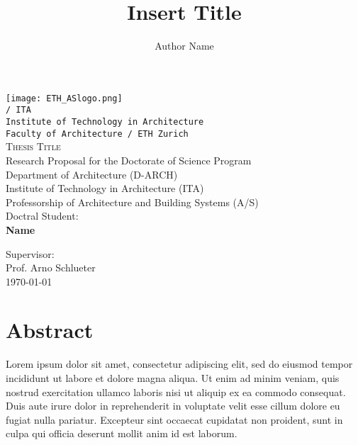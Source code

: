 
\begin{titlepage}
\vspace*{-2.5cm}
\hspace*{-1cm}

\noindent
\texttt{[image: ETH\_ASlogo.png]}\\


\noindent
\texttt{\textcolor{suatblue}{/ ITA\\
	Institute of Technology in Architecture\\
	Faculty of Architecture / ETH Zurich}}\\[.5cm]


\noindent
\textsc{\LARGE Thesis Title }\\[0.4cm]

\noindent
Research Proposal for the Doctorate of Science Program\\
Department of Architecture (D-ARCH)\\
Institute of Technology in Architecture (ITA)\\
Professorship of Architecture and Building Systems (A/S)\\[0.5cm]

\noindent
Doctral Student:\\
\textbf{Name}

\noindent
Supervisor:\\
Prof. Arno Schlueter\\[0.5cm]
\noindent
\today\\[0.1cm]

\section*{Abstract}

Lorem ipsum dolor sit amet, consectetur adipiscing elit, sed do eiusmod tempor incididunt ut labore et dolore magna aliqua. Ut enim ad minim veniam, quis nostrud exercitation ullamco laboris nisi ut aliquip ex ea commodo consequat. Duis aute irure dolor in reprehenderit in voluptate velit esse cillum dolore eu fugiat nulla pariatur. Excepteur sint occaecat cupidatat non proident, sunt in culpa qui officia deserunt mollit anim id est laborum.







\end{titlepage}



\title{Insert Title}
\author{Author Name}



\tableofcontents
